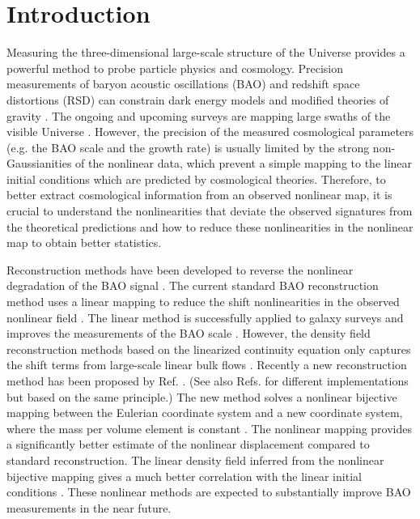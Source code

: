 \documentclass[aps,prx,twocolumn,superscriptaddress,groupedaddress,nofootinbib,amsfont]{revtex4}  %
\begin{document}
\pacs{}
\maketitle


\section{Introduction}
Measuring the three-dimensional large-scale structure of the Universe provides
a powerful method to probe particle physics and cosmology.
Precision measurements of baryon acoustic oscillations (BAO) and redshift space
distortions (RSD) can constrain dark energy models and modified theories of
gravity \cite{2016sdss,2017F,2017R,2016V,2017F2,2017G,2017S,2016S,2017Z}. 
The ongoing and upcoming surveys are mapping large swaths of the visible 
Universe \cite{2016sdss,CHIME,tianlai,DESI,pfs}.
However, the precision of the measured cosmological parameters (e.g. the BAO 
scale and the growth rate) is usually limited by the strong non-Gaussianities
of the nonlinear data, which prevent a simple mapping to the linear initial 
conditions which are predicted by cosmological theories. 
Therefore, to better extract cosmological information from an observed nonlinear
map, it is crucial to understand the nonlinearities that deviate the observed 
signatures from the theoretical predictions and how to reduce these 
nonlinearities in the nonlinear map to obtain better statistics.

Reconstruction methods have been developed to reverse the nonlinear degradation
of the BAO signal \cite{2007bao,2012TZ2,2015marcel,2017BAOP}. 
The current standard BAO reconstruction method uses a linear mapping to reduce
the shift nonlinearities in the observed nonlinear field \cite{2007bao}.
The linear method is successfully applied to galaxy surveys and improves the
measurements of the BAO scale \cite{2012nikhil,2012Anderson,2014K,2014Anderson,2014T,2015Ross,2017F,2017R}.
However, the density field reconstruction methods based on the linearized 
continuity equation only captures the shift terms from large-scale
linear bulk flows \cite{2007ESW,2009PWC,2009NWP,2012TZ,2014Tassev,2016Seo}.
Recently a new reconstruction method has been proposed by Ref. \cite{2016HMZ}. 
(See also Refs. \cite{2017Marcel,2017Shi} for different implementations but 
based on the same principle.)
The new method solves a nonlinear bijective mapping between the Eulerian 
coordinate system and a new coordinate system, where the mass per volume 
element is constant \cite{2016HMZ}. 
The nonlinear mapping provides a significantly better estimate of the nonlinear
displacement compared to standard reconstruction.
The linear density field inferred from the nonlinear bijective mapping gives a
much better correlation with the linear initial conditions \cite{2016HMZ}.
These nonlinear methods are expected to substantially improve BAO measurements 
in the near future.
\end{document}
